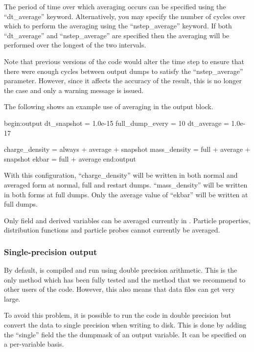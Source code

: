 The period of time over which averaging occurs can be specified using the
``dt\_average'' keyword. Alternatively, you may specify the number of cycles
over which to perform the averaging using the ``nstep\_average'' keyword.
If both ``dt\_average'' and ``nstep\_average'' are specified then the
averaging will be performed over the longest of the two intervals.

Note that previous versions of the code would alter the time step to
ensure that there were enough cycles between output dumps to satisfy the
``nstep\_average'' parameter. However, since it affects the accuracy of
the result, this is no longer the case and only a warning message is issued.

The following shows an example use of averaging in the output block.
\begin{boxverbatim}
begin:output
   dt_snapshot = 1.0e-15
   full_dump_every = 10
   dt_average = 1.0e-17

   charge_density = always + average + snapshot
   mass_density = full + average + snapshot
   ekbar = full + average
end:output
\end{boxverbatim}

With this configuration, ``charge\_density'' will be written in both normal and
averaged form at normal, full and restart dumps. ``mass\_density'' will be
written in both forms at full dumps. Only the average value of
``ekbar'' will be written at full dumps.

Only field and derived variables can be averaged currently in {\EPOCH}.
Particle properties, distribution functions and particle probes cannot
currently be averaged.

\subsubsection{Single-precision output}
\label{sec:single_precision_output}

By default, {\EPOCH} is compiled and run using double precision arithmetic.
This is the only method which has been fully tested and the method that
we recommend to other users of the code. However, this also means that
data files can get very large.

To avoid this problem, it is possible to run the code in double precision
but convert the data to single precision when writing to disk. This is done
by adding the ``single'' field the the dumpmask of an output variable.
It can be specified on a per-variable basis.

